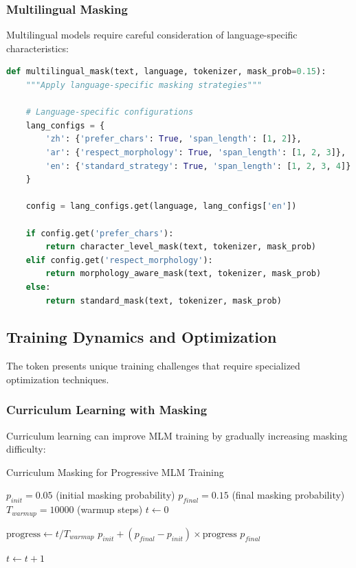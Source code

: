 \subsubsection{Multilingual Masking}

Multilingual models require careful consideration of language-specific characteristics:

\begin{lstlisting}[language=Python, caption=Language-aware masking]
def multilingual_mask(text, language, tokenizer, mask_prob=0.15):
    """Apply language-specific masking strategies"""
    
    # Language-specific configurations
    lang_configs = {
        'zh': {'prefer_chars': True, 'span_length': [1, 2]},
        'ar': {'respect_morphology': True, 'span_length': [1, 2, 3]},
        'en': {'standard_strategy': True, 'span_length': [1, 2, 3, 4]}
    }
    
    config = lang_configs.get(language, lang_configs['en'])
    
    if config.get('prefer_chars'):
        return character_level_mask(text, tokenizer, mask_prob)
    elif config.get('respect_morphology'):
        return morphology_aware_mask(text, tokenizer, mask_prob)
    else:
        return standard_mask(text, tokenizer, mask_prob)
\end{lstlisting}

\subsection{Training Dynamics and Optimization}

The \mask{} token presents unique training challenges that require specialized optimization techniques.

\subsubsection{Curriculum Learning with Masking}

Curriculum learning can improve MLM training by gradually increasing masking difficulty:

\begin{algorithm}[h]
\caption{Curriculum Masking for Progressive MLM Training}
\begin{algorithmic}[1]
\Require $p_{init} = 0.05$ (initial masking probability)
\Require $p_{final} = 0.15$ (final masking probability)  
\Require $T_{warmup} = 10000$ (warmup steps)
\State $t \gets 0$ 

        \State $\text{progress} \gets t / T_{warmup}$ 
        \State \Return $p_{init} + (p_{final} - p_{init}) \times \text{progress}$
    \Else
        \State \Return $p_{final}$ 
    \EndIf
\EndFunction

    \State $t \gets t + 1$ 
\EndFunction

\end{algorithmic}
\end{algorithm}

